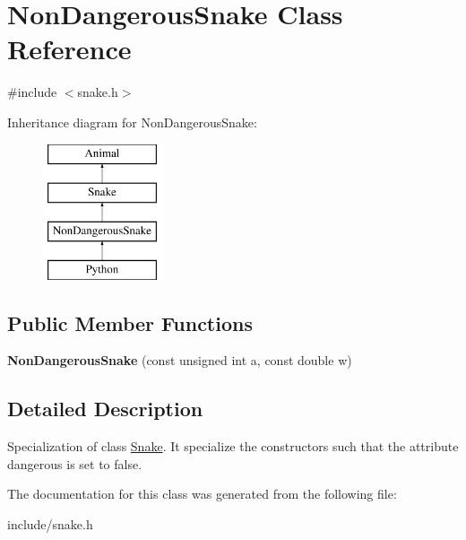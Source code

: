 \hypertarget{classNonDangerousSnake}{}\section{Non\+Dangerous\+Snake Class Reference}
\label{classNonDangerousSnake}


{\ttfamily \#include $<$snake.\+h$>$}

Inheritance diagram for Non\+Dangerous\+Snake\+:\begin{figure}[H]
\begin{center}
\leavevmode
\includegraphics[height=4.000000cm]{classNonDangerousSnake}
\end{center}
\end{figure}
\subsection*{Public Member Functions}
\begin{DoxyCompactItemize}
\item 
\mbox{\label{classNonDangerousSnake_a3f5ac2522dd02fc5d55a34f30eec7e43}} 
{\bfseries Non\+Dangerous\+Snake} (const unsigned int a, const double w)
\end{DoxyCompactItemize}


\subsection{Detailed Description}
Specialization of class \hyperlink{classSnake}{Snake}. It specialize the constructors such that the attribute {\ttfamily dangerous} is set to false. 

The documentation for this class was generated from the following file\+:\begin{DoxyCompactItemize}
\item 
include/snake.\+h\end{DoxyCompactItemize}
